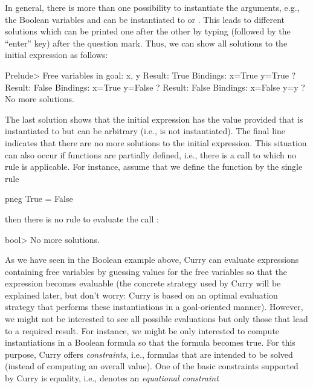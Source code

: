 In general, there is more than one possibility
to instantiate the arguments, e.g., the Boolean variables
 and  can be instantiated to  or .
This leads to different solutions which can be printed
one after the other by typing \ccode{;} (followed by the ``enter'' key)
after the question mark. Thus, we can show all solutions to the
initial expression as follows:
\begin{prog}
Prelude> 
Free variables in goal: x, y
Result: True
Bindings: 
x=True
y=True ? \userinput{;}
Result: False
Bindings: 
x=True
y=False ? \userinput{;}
Result: False
Bindings: 
x=False
y=y ? \userinput{;}
No more solutions.
\end{prog}
The last solution shows that the initial expression has the value
 provided that  is instantiated to 
but  can be arbitrary (i.e.,  is not instantiated).
The final line indicates that there are no more solutions to the
initial expression. This situation can also occur if functions
are partially defined, i.e., there is a call to which no rule
is applicable. For instance, assume that we define the function
 by the single rule
\begin{prog}
pneg True = False
\end{prog}
then there is no rule to evaluate the call :
\begin{prog}
bool> 
No more solutions.
\end{prog}
As we have seen in the Boolean example above,
Curry can evaluate expressions containing free variables
by guessing values for the free variables so that the expression
becomes evaluable (the concrete strategy used by Curry will be
explained later, but don't worry: Curry is based on an optimal
evaluation strategy \cite{AntoyEchahedHanus00JACM} that performs
these instantiations in a goal-oriented manner).
However, we might not be interested to see
all possible evaluations but only those that lead to a required
result. For instance, we might be only interested to compute
instantiations in a Boolean formula so that the formula becomes true.
For this purpose, Curry offers \emph{constraints},
i.e., formulas that are intended to be solved (instead of computing
an overall value). One of the basic constraints supported by Curry
is equality, i.e.,  denotes an
\emph{equational constraint}%
